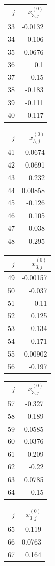 {\begin{tabular}[t]{r|r}
$j$ & $x^{(0)}_{3,j}$ \\\hline
33 & -0.0132 \\
34 & 0.106 \\
35 & 0.0676 \\
36 & 0.1 \\
37 & 0.15 \\
38 & -0.183 \\
39 & -0.111 \\
40 & 0.117
\end{tabular}\kern4pt
\begin{tabular}[t]{r|r}
$j$ & $x^{(0)}_{3,j}$ \\\hline
41 & 0.0674 \\
42 & 0.0691 \\
43 & 0.232 \\
44 & 0.00858 \\
45 & -0.126 \\
46 & 0.105 \\
47 & 0.038 \\
48 & 0.295
\end{tabular}\kern4pt
\begin{tabular}[t]{r|r}
$j$ & $x^{(0)}_{3,j}$ \\\hline
49 & -0.00157 \\
50 & -0.037 \\
51 & -0.11 \\
52 & 0.125 \\
53 & -0.134 \\
54 & 0.171 \\
55 & 0.00902 \\
56 & -0.197
\end{tabular}\kern4pt
\begin{tabular}[t]{r|r}
$j$ & $x^{(0)}_{3,j}$ \\\hline
57 & -0.327 \\
58 & -0.189 \\
59 & -0.0585 \\
60 & -0.0376 \\
61 & -0.209 \\
62 & -0.22 \\
63 & 0.0785 \\
64 & 0.15
\end{tabular}\kern4pt
\begin{tabular}[t]{r|r}
$j$ & $x^{(0)}_{3,j}$ \\\hline
65 & 0.119 \\
66 & 0.0763 \\
67 & 0.164 \\

\end{tabular}}
